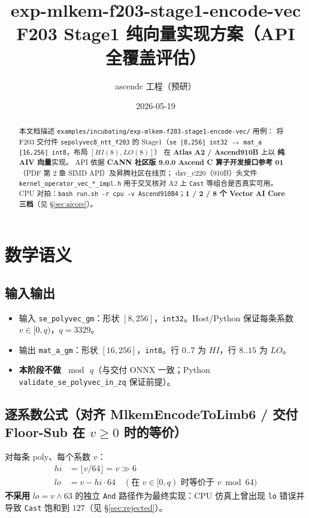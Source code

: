 \documentclass[UTF8,a4paper,11pt]{ctexart}
\title{exp-mlkem-f203-stage1-encode-vec\\F203 Stage1 纯向量实现方案（API 全覆盖评估）}
\author{ascendc 工程（预研）}
\date{2026-05-19}
\begin{document}
\maketitle

\begin{abstract}
本文档描述 \texttt{examples/incubating/exp-mlkem-f203-stage1-encode-vec/} 用例：
将 F203 交付件 \texttt{sepolyvec8\_ntt\_f203} 的 Stage1（\texttt{se [8,256] int32} $\rightarrow$ \texttt{mat\_a [16,256] int8}，布局 $[HI(8),LO(8)]$）
在 \textbf{Atlas A2 / Ascend910B} 上以 \textbf{纯 AIV 向量}实现。
API 依据 \textbf{CANN 社区版 9.0.0 Ascend C 算子开发接口参考 01}（PDF 第 2 章 SIMD API）及昇腾社区在线页；
dav\_c220（910B）头文件 \texttt{kernel\_operator\_vec\_*\_impl.h} 用于交叉核对 A2 上 \texttt{Cast} 等组合是否真实可用。
CPU 对拍：\texttt{bash run.sh -r cpu -v Ascend910B4}；\textbf{1 / 2 / 8 个 Vector AI Core 三档}（见 §\ref{sec:aicore}）。
\end{abstract}

\tableofcontents
\newpage

\section{数学语义}

\subsection{输入输出}
\begin{itemize}
  \item 输入 \texttt{se\_polyvec\_gm}：形状 $[8,256]$，\texttt{int32}。Host/Python 保证每条系数 $v \in [0,q)$，$q=3329$。
  \item 输出 \texttt{mat\_a\_gm}：形状 $[16,256]$，\texttt{int8}。行 $0..7$ 为 $HI$，行 $8..15$ 为 $LO$。
  \item \textbf{本阶段不做 $\bmod\,q$}（与交付 ONNX 一致；Python \texttt{validate\_se\_polyvec\_in\_zq} 保证前提）。
\end{itemize}

\subsection{逐系数公式（对齐 MlkemEncodeToLimb6 / 交付 Floor-Sub 在 $v\ge0$ 时的等价）}
对每条 poly、每个系数 $v$：
\begin{align}
  hi &= \lfloor v / 64 \rfloor = v \gg 6 \\
  lo &= v - hi \cdot 64 \quad (\text{在 } v\in[0,q) \text{ 时等价于 } v \bmod 64)
\end{align}
\textbf{不采用} $lo = v \land 63$ 的独立 \texttt{And} 路径作为最终实现：CPU 仿真上曾出现 \texttt{lo} 错误并导致 \texttt{Cast} 饱和到 $127$（见 §\ref{sec:rejected}）。
\end{document}
